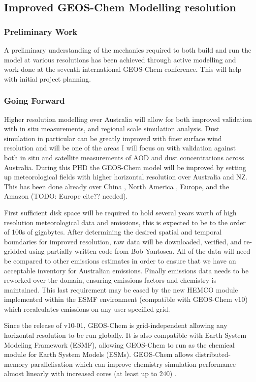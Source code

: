 \subsection{Improved GEOS-Chem Modelling resolution}
\subsubsection{Preliminary Work}
A preliminary understanding of the mechanics required to both build and run the model at various resolutions has been achieved through active modelling and work done at the seventh international GEOS-Chem conference.
This will help with initial project planning.

\subsubsection{Going Forward}
Higher resolution modelling over Australia will allow for both improved validation with in situ measurements, and regional scale simulation analysis. 
Dust simulation in particular can be greatly improved with finer surface wind resolution and will be one of the areas I will focus on with validation against both in situ and satellite measurements of AOD and dust concentrations across Australia.
During this PHD the GEOS-Chem model will be improved by setting up meteorological fields with higher horizontal resolution over Australia and NZ.
This has been done already over China \cite{Chen_2009,Wang_2004}, North America \cite{Zhang_2012}, Europe, and the Amazon (TODO: Europe cite?? needed).

First sufficient disk space will be required to hold several years worth of high resolution meteorological data and emissions, this is expected to be to the order of 100s of gigabytes.
After determining the desired spatial and temporal boundaries for improved resolution, raw data will be downloaded, verified, and re-gridded using partially written code from Bob Yantosca.
All of the data will need be compared to other emissions estimates in order to ensure that we have an acceptable inventory for Australian emissions.
Finally emissions data needs to be reworked over the domain, ensuring emissions factors and chemistry is maintained.
This last requirement may be eased by the new HEMCO module implemented within the ESMF environment (compatible with GEOS-Chem v10) which recalculates emissions on any user specified grid.
  
Since the release of v10-01, GEOS-Chem is grid-independent allowing any horizontal resolution to be run globally. 
It is also compatible with Earth System Modeling Framework (ESMF), allowing GEOS-Chem to run as the chemical module for Earth System Models (ESMs). 
GEOS-Chem allows distributed-memory parallelisation which can improve chemistry simulation performance almost linearly with increased cores (at least up to 240) \cite{Long_2015}.

